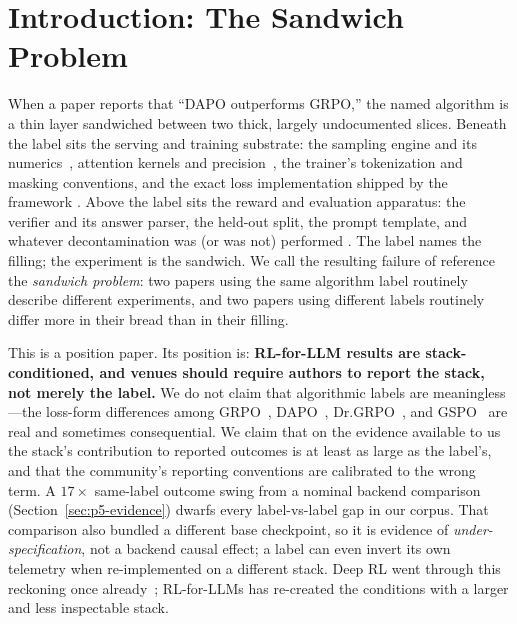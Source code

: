 \documentclass{article}  \usepackage[preprint,nonatbib]{neurips_2026} \usepackage[numbers]{natbib}
\providecommand{\secref}[1]{Section~\ref{#1}}
\begin{document}
 \section{Introduction: The Sandwich Problem}
\label{sec:p5-intro}
When a paper reports that ``DAPO outperforms GRPO,'' the named algorithm is a
thin layer sandwiched between two thick, largely undocumented slices. Beneath the
label sits the serving and training substrate: the sampling engine and its
numerics~\citep{kwon2023vllm, zheng2024sglang}, attention kernels and
precision~\citep{dao2022flashattention}, the trainer's tokenization and masking
conventions, and the exact loss implementation shipped by the framework
\citep{vonwerra2022trl, sheng2024verl, hu2024openrlhf, thinkingmachines2024tinker}.
Above the label sits the reward and evaluation apparatus: the verifier and its
answer parser, the held-out split, the prompt template, and whatever
decontamination was (or was not) performed \citep{zhang2024gsm1k,
riddell2024contamination}. The label names the filling; the experiment is the
sandwich. We call the resulting failure of reference the \emph{sandwich problem}:
two papers using the same algorithm label routinely describe different
experiments, and two papers using different labels routinely differ more in their
bread than in their filling.

This is a position paper. Its position is: \textbf{RL-for-LLM results are
stack-conditioned, and venues should require authors to report the stack, not
merely the label.} We do not claim that algorithmic labels are meaningless---the
loss-form differences among GRPO~\citep{shao2024deepseekmath, guo2025deepseekr1},
DAPO~\citep{yu2025dapo}, Dr.GRPO~\citep{tong2025drgrpo}, and
GSPO~\citep{qwen2025gspo} are real and sometimes consequential. We claim that on
the evidence available to us the stack's contribution to reported outcomes is at
least as large as the label's, and that the community's reporting conventions are
calibrated to the wrong term. A $17\times$ same-label outcome swing from a
nominal backend comparison (\secref{sec:p5-evidence}) dwarfs every label-vs-label
gap in our corpus. That comparison also bundled a different base checkpoint, so
it is evidence of \emph{under-specification}, not a backend causal effect; a label
can even invert its own telemetry when re-implemented on a
different stack. Deep RL went through this reckoning once
already~\citep{henderson2018deep, colas2019hitchhiker, agarwal2021deep};
RL-for-LLMs has re-created the conditions with a larger and less inspectable
stack.
\end{document}
